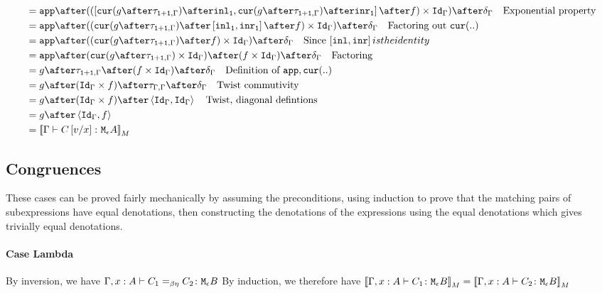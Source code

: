 {\begin{align}
            & = \app\after((\fld{
                \cur{g\after\twist{\1+\1}{\G}}\after\inl_\1
            }{
                \cur{g\after\twist{\1+\1}{\G}}\after\inr_\1
            }\after f)\times \idg)\after\diag{\G}\qt{Exponential property}\\
            & = \app\after((\cur{g\after\twist{\1+\1}{\G}}\after\fld{
                \inl_\1
            }{
                \inr_\1
            }\after f)\times \idg)\after\diag{\G}\qt{Factoring out $\cur{..}$}\\
            & = \app\after((\cur{g\after\twist{\1+\1}{\G}}\after f)\times \idg)\after\diag{\G}\qt{Since $\fld{\inl}{\inr} is the identity$}\\
            & = \app\after(\cur{g\after\twist{\1+\1}{\G}}\times \idg)\after (f\times \idg)\after\diag{\G}\qt{Factoring}\\
           & = g\after\twist{\1+\1}{\G} \after (f\times \idg)\after\diag{\G} \qt{Definition of $\app,\cur{..}$}\\
           & = g\after(\idg\times f)\after \twist{\G}{\G} \after\diag{\G} \qt{Twist commutivity}\\
           & = g\after(\idg\times f) \after\pr{\idg}{\idg} \qt{Twist, diagonal defintions} \\
           & = g\after\pr{\idg}{f} \\
           & = \deno{\gtyperelation{C\ssub{x}{v}}{\mea}} \\
        \end{align}






    \subsection{Congruences}
    These cases can be proved fairly mechanically by assuming the preconditions, using induction to prove that the matching pairs of subexpressions have equal denotations, then constructing the denotations of the expressions using the equal denotations which gives trivially equal denotations.

    \paragraph{Case Lambda}
        By inversion, we have $\Gamma, x: A \vdash C_1 =_{\beta\eta} C_2 \colon \texttt{M}_{\epsilon}{B}$
        By induction, we therefore have ${\bf [\![}\Gamma, x: A \vdash C_1 \colon \texttt{M}_{\epsilon}{B}{\bf ]\!]}_M = {\bf [\![}\Gamma, x: A \vdash C_2 \colon \texttt{M}_{\epsilon}{B}{\bf ]\!]}_M$

}
